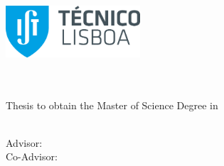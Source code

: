 
\begin{titlepage}
\includegraphics[width=5cm]{images/ist_logo}~\\[4.0cm]
\begin{center}
{\LARGE \textbf{\Title}}\\[1.0cm]
{\Large \textbf{\StudentName}}\\[1.0cm]
{\large Thesis to obtain the Master of Science Degree in}\\[1.0cm]
{\LARGE \textbf{\DegreeName}}\\[1.0cm]

\begin{minipage}[t]{.35\textwidth}
  \begin{flushright}
    {\large Advisor:~~}\\
    {\large Co-Advisor:~~}
  \end{flushright}
\end{minipage}%
\begin{minipage}[t]{.65\textwidth}
  \begin{flushleft}
    {\Supervisors}
  \end{flushleft}
\end{minipage}\\[10.0cm]


\end{center}
\end{titlepage}
